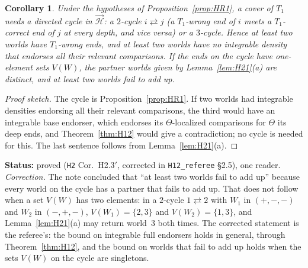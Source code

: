 \documentclass[11pt]{article}
\newtheorem{corollary}[theorem]{Corollary}
\theoremstyle{definition}
\theoremstyle{remark}
\newcommand{\src}[1]{\texttt{#1}}
\newcommand{\status}[1]{\par\smallskip\noindent\textbf{Status:} #1\par\smallskip}
\begin{document}
\begin{corollary}\label{cor:H23p}
Under the hypotheses of Proposition~\ref{prop:HR1}, a cover of $T_1$ needs a directed cycle in $\vec{\mathcal H}$: a $2$-cycle $i\rightleftarrows j$ (a $T_1$-wrong end of $i$ meets a $T_1$-correct end of $j$ at every depth, and vice versa) or a $3$-cycle. Hence at least two worlds have $T_1$-wrong ends, and at least two worlds have no integrable density that endorses all their relevant comparisons. If the ends on the cycle have one-element sets $V(W)$, the partner worlds given by Lemma~\ref{lem:H21}(a) are distinct, and at least two worlds fail to add up.
\end{corollary}
\begin{proof}[Proof sketch]
The cycle is Proposition~\ref{prop:HR1}. If two worlds had integrable densities endorsing all their relevant comparisons, the third would have an integrable base endorser, which endorses its $\Theta$-localized comparisons for $\Theta$ its deep ends, and Theorem~\ref{thm:H12} would give a contradiction; no cycle is needed for this. The last sentence follows from Lemma~\ref{lem:H21}(a).
\end{proof}
\status{proved (\src{H2} Cor.~H2.3$'$, corrected in \src{H12\_referee} \S2.5), one reader. \emph{Correction.} The note concluded that ``at least two worlds fail to add up'' because every world on the cycle has a partner that fails to add up. That does not follow when a set $V(W)$ has two elements: in a $2$-cycle $1\rightleftarrows2$ with $W_1$ in $(+,-,-)$ and $W_2$ in $(-,+,-)$, $V(W_1)=\{2,3\}$ and $V(W_2)=\{1,3\}$, and Lemma~\ref{lem:H21}(a) may return world~3 both times. The corrected statement is the referee's: the bound on integrable full endorsers holds in general, through Theorem~\ref{thm:H12}, and the bound on worlds that fail to add up holds when the sets $V(W)$ on the cycle are singletons.}
\end{document}

